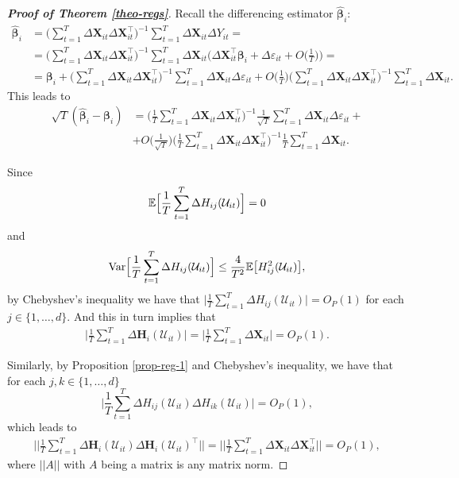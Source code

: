 \begin{proof}[\textnormal{\textbf{Proof of Theorem \ref{theo-regs}}}]
Recall the differencing estimator $\widehat{\bm{\beta}}_i$:
\begin{align*}
\widehat{\bm{\beta}}_i &= \Big( \sum_{t=1}^T \Delta \mathbf{X}_{it} \Delta \mathbf{X}_{it}^\top \Big)^{-1} \sum_{t=1}^T \Delta \mathbf{X}_{it} \Delta Y_{it} =\\
& =  \Big( \sum_{t=1}^T \Delta \mathbf{X}_{it} \Delta \mathbf{X}_{it}^\top \Big)^{-1} \sum_{t=1}^T \Delta \mathbf{X}_{it} \bigg(\Delta \mathbf{X}_{it}^\top \bm{\beta}_i + \Delta \varepsilon_{it} + O\Big(\frac{1}{T}\Big) \bigg) =\\
&= \bm{\beta}_i +  \Big( \sum_{t=1}^T \Delta \mathbf{X}_{it} \Delta \mathbf{X}_{it}^\top \Big)^{-1} \sum_{t=1}^T \Delta \mathbf{X}_{it} \Delta \varepsilon_{it}
+  O\Big(\frac{1}{T}\Big) \Big( \sum_{t=1}^T \Delta \mathbf{X}_{it} \Delta \mathbf{X}_{it}^\top \Big)^{-1} \sum_{t=1}^T \Delta \mathbf{X}_{it}. 
\end{align*}
This leads to
\begin{align*}
\sqrt{T}( \widehat{\bm{\beta}}_i - \bm{\beta}_i) &=  \Big(\frac{1}{T} \sum_{t=1}^T \Delta \mathbf{X}_{it} \Delta \mathbf{X}_{it}^\top \Big)^{-1}\frac{1}{\sqrt{T}} \sum_{t=1}^T \Delta \mathbf{X}_{it} \Delta \varepsilon_{it} +\\
&+  O\Big(\frac{1}{\sqrt{T}}\Big) \Big( \frac{1}{T}\sum_{t=1}^T \Delta \mathbf{X}_{it} \Delta \mathbf{X}_{it}^\top \Big)^{-1} \frac{1}{T}\sum_{t=1}^T \Delta \mathbf{X}_{it}.
\end{align*}

Since 
\[\mathbb{E} \Big[ \frac{1}{T}\sum_{t=1}^T \Delta H_{ij}(\mathcal{U}_{it})\Big] = 0\]
and 
\[\textnormal{Var} \Big[ \frac{1}{T}\sum_{t=1}^T \Delta H_{ij}(\mathcal{U}_{it})\Big] \leq \frac{4}{T^2} \mathbb{E}\big[H_{ij}^2(\mathcal{U}_{it})\big],\]
by Chebyshev's inequality we have that $\Big|\frac{1}{T}\sum_{t=1}^T \Delta H_{ij}(\mathcal{U}_{it})\Big| = O_P(1)$ for each $j\in\{1, \ldots, d\} $. And this in turn implies that
\begin{align}\label{proof-1}
\Big|\frac{1}{T}\sum_{t=1}^T \Delta \mathbf{H}_i (\mathcal{U}_{it}) \Big| = \Big| \frac{1}{T}\sum_{t=1}^T \Delta \mathbf{X}_{it}\Big| = O_P(1).
\end{align}


Similarly, by Proposition \ref{prop-reg-1} and Chebyshev's inequality, we have that for each $j, k\in\{1, \ldots, d\}$
\[  \Big|\frac{1}{T}\sum_{t=1}^T \Delta H_{ij}(\mathcal{U}_{it}) \Delta H_{ik}(\mathcal{U}_{it})\Big| = O_P(1),
\]
which leads to 
\begin{align}\label{proof-2}
\Big|\Big| \frac{1}{T}\sum_{t=1}^T \Delta \mathbf{H}_i (\mathcal{U}_{it})\Delta \mathbf{H}_i (\mathcal{U}_{it})^\top \Big|\Big| =\Big|\Big|\frac{1}{T}\sum_{t=1}^T\Delta \mathbf{X}_{it} \Delta \mathbf{X}_{it}^\top\Big|\Big| = O_P(1),
\end{align}
where $||A||$ with $A$ being a matrix is any matrix norm.


\end{proof}
